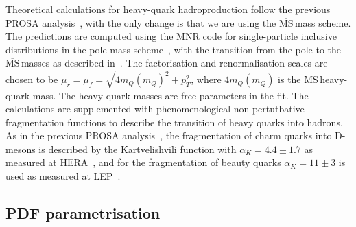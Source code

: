 \documentclass[12pt]{article}
\newcommand{\msbar}{$\overline{\text{MS}}\, $}
\begin{document}
Theoretical calculations for heavy-quark hadroproduction follow the previous PROSA analysis~\cite{Zenaiev:2015rfa}, with the only change is that we are using the \msbar mass scheme.
The predictions are computed using the MNR code for single-particle inclusive distributions in the pole mass scheme~\cite{Dowling:2013baa}, with the transition from the pole to the \msbar masses as described in~\cite{Dowling:2013baa}.
The factorisation and renormalisation scales are chosen to be $\mu_r = \mu_f = \sqrt{4m_Q(m_Q)^2+p_T^2}$, where $4m_Q(m_Q)$ is the \msbar heavy-quark mass. The heavy-quark masses are free parameters in the fit. 
The calculations are supplemented with phenomenological non-pertutbative fragmentation functions to describe the transition of heavy quarks into hadrons. 
As in the previous PROSA analysis~\cite{Zenaiev:2015rfa}, the fragmentation of charm quarks into D-mesons is described by the Kartvelishvili function with $\alpha_K = 4.4 \pm 1.7$ as measured at HERA~\cite{Aaron:2008ac,Chekanov:2008ur}, and for the fragmentation of beauty quarks $\alpha_K = 11 \pm 3$ is used as measured at LEP~\cite{Nason:1999zj}.

\subsection{PDF parametrisation}
\label{sec:pdfparam}
\end{document}
